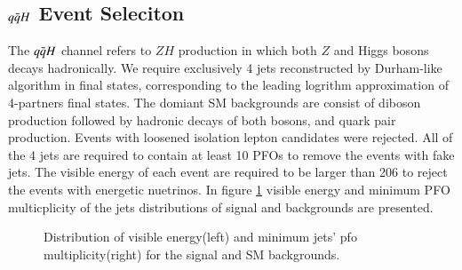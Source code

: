 \subsection{$q\bar{q}H$ Event Seleciton} 
The $q\bar{q}H$ channel refers to $ZH$ production in which both $Z$ and Higgs bosons decays hadronically.
We require exclusively 4 jets reconstructed by Durham-like algorithm\cite{Durham} in final states, corresponding to the leading logrithm approximation of 4-partners final states. The domiant SM backgrounds are consist of diboson production followed by hadronic decays of both bosons, and quark pair production. Events with loosened isolation lepton candidates were rejected.
All of the 4 jets are required to contain at least 10 PFOs to remove the 
events with fake jets. 
The visible energy of each event are required to be larger than 206 \GeV 
to reject the events with energetic nuetrinos. 
In figure \ref{fig:VisEn_nPFO} visible energy and minimum PFO multicplicity of the jets distributions of signal and backgrounds are presented.\par
\begin{figure}
\label{fig:VisEn_nPFO}
\centering
{}
\caption{Distribution of visible energy(left) and minimum jets' pfo multiplicity(right) for the signal and SM backgrounds.}
\end{figure}



